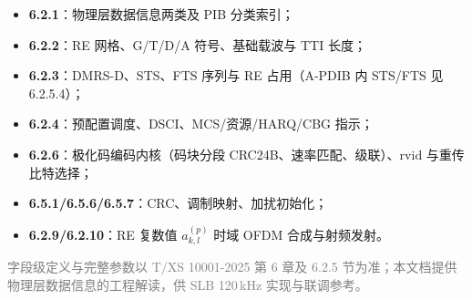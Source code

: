 \documentclass[11pt,a4paper]{ctexart}
\begin{document}
\begin{itemize}[nosep]
  \item \textbf{6.2.1}：物理层数据信息两类及 PIB 分类索引；
  \item \textbf{6.2.2}：RE 网格、G/T/D/A 符号、基础载波与 TTI 长度；
  \item \textbf{6.2.3}：DMRS-D、STS、FTS 序列与 RE 占用（A-PDIB 内 STS/FTS 见 6.2.5.4）；
  \item \textbf{6.2.4}：预配置调度、DSCI、MCS/资源/HARQ/CBG 指示；
  \item \textbf{6.2.6}：极化码编码内核（码块分段 CRC24B、速率匹配、级联）、$\mathrm{rvid}$ 与重传比特选择；
  \item \textbf{6.5.1/6.5.6/6.5.7}：CRC、调制映射、加扰初始化；
  \item \textbf{6.2.9/6.2.10}：RE 复数值 $a_{k,l}^{(p)}$ 时域 OFDM 合成与射频发射。
\end{itemize}

\vfill
\begin{center}
\small\textcolor{gray}{字段级定义与完整参数以 T/XS 10001-2025 第 6 章及 6.2.5 节为准；本文档提供物理层数据信息的工程解读，供 SLB 120\,kHz 实现与联调参考。}
\end{center}
\end{document}
